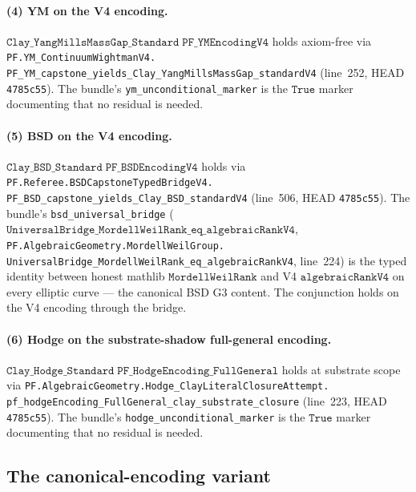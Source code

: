 \documentclass[11pt,a4paper]{article}
\theoremstyle{plain}
\theoremstyle{definition}
\begin{document}
\paragraph{(4) YM on the V4 encoding.}
$\mathtt{Clay\_YangMillsMassGap\_Standard\;PF\_YMEncodingV4}$ holds
axiom-free via
\texttt{PF.YM\_ContinuumWightmanV4.\\
PF\_YM\_capstone\_yields\_Clay\_YangMillsMassGap\_standardV4}
(line~252, HEAD \texttt{4785c55}). The bundle's
\texttt{ym\_unconditional\_marker} is the $\mathtt{True}$ marker
documenting that no residual is needed.

\paragraph{(5) BSD on the V4 encoding.}
$\mathtt{Clay\_BSD\_Standard\;PF\_BSDEncodingV4}$ holds via
\texttt{PF.Referee.BSDCapstoneTypedBridgeV4.\\
PF\_BSD\_capstone\_yields\_Clay\_BSD\_standardV4}
(line~506, HEAD \texttt{4785c55}). The bundle's
\texttt{bsd\_universal\_bridge}
($\mathtt{UniversalBridge\_MordellWeilRank\_eq\_algebraicRankV4}$,
\texttt{PF.AlgebraicGeometry.MordellWeilGroup.\\
UniversalBridge\_MordellWeilRank\_eq\_algebraicRankV4},
line~224) is the typed identity between honest mathlib
$\mathtt{MordellWeilRank}$ and V4
$\mathtt{algebraicRankV4}$ on every elliptic curve --- the canonical
BSD G3 content. The conjunction holds on the V4 encoding through
the bridge.

\paragraph{(6) Hodge on the substrate-shadow full-general encoding.}
$\mathtt{Clay\_Hodge\_Standard\;PF\_HodgeEncoding\_FullGeneral}$
holds at substrate scope via
\texttt{PF.AlgebraicGeometry.Hodge\_ClayLiteralClosureAttempt.\\
pf\_hodgeEncoding\_FullGeneral\_clay\_substrate\_closure}
(line~223, HEAD \texttt{4785c55}). The bundle's
\texttt{hodge\_unconditional\_marker} is the $\mathtt{True}$ marker
documenting that no residual is needed.

\subsection{The canonical-encoding variant}
\label{sec:canonical-variant}
\end{document}

